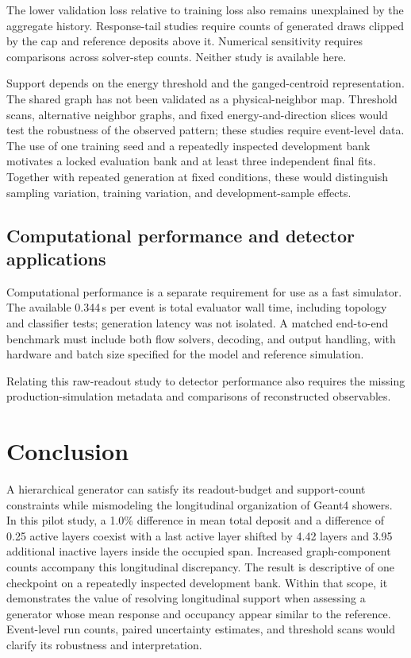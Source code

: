 \documentclass[11pt]{article}
\begin{document}
The lower validation loss relative to training loss also remains unexplained by the aggregate history. Response-tail studies require counts of generated draws clipped by the cap and reference deposits above it. Numerical sensitivity requires comparisons across solver-step counts. Neither study is available here.

Support depends on the energy threshold and the ganged-centroid representation. The shared graph has not been validated as a physical-neighbor map. Threshold scans, alternative neighbor graphs, and fixed energy-and-direction slices would test the robustness of the observed pattern; these studies require event-level data. The use of one training seed and a repeatedly inspected development bank motivates a locked evaluation bank and at least three independent final fits. Together with repeated generation at fixed conditions, these would distinguish sampling variation, training variation, and development-sample effects.

\subsection{Computational performance and detector applications}

Computational performance is a separate requirement for use as a fast simulator. The available 0.344\,s per event is total evaluator wall time, including topology and classifier tests; generation latency was not isolated. A matched end-to-end benchmark must include both flow solvers, decoding, and output handling, with hardware and batch size specified for the model and reference simulation.

Relating this raw-readout study to detector performance also requires the missing production-simulation metadata and comparisons of reconstructed observables.

\section{Conclusion}

A hierarchical generator can satisfy its readout-budget and support-count constraints while mismodeling the longitudinal organization of Geant4 showers. In this pilot study, a 1.0\% difference in mean total deposit and a difference of 0.25 active layers coexist with a last active layer shifted by 4.42 layers and 3.95 additional inactive layers inside the occupied span. Increased graph-component counts accompany this longitudinal discrepancy. The result is descriptive of one checkpoint on a repeatedly inspected development bank. Within that scope, it demonstrates the value of resolving longitudinal support when assessing a generator whose mean response and occupancy appear similar to the reference. Event-level run counts, paired uncertainty estimates, and threshold scans would clarify its robustness and interpretation.
\end{document}
